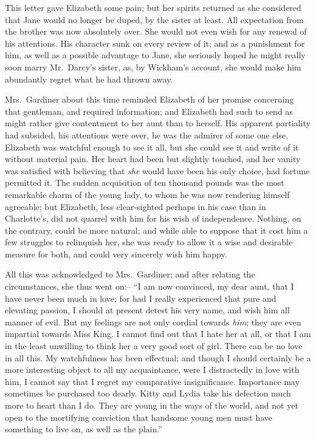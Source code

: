 This letter gave Elizabeth some pain; but her spirits
returned as she considered that Jane would no longer be
duped, by the sister at least. All expectation from the
brother was now absolutely over. She would not even
wish for any renewal of his attentions. His character
sunk on every review of it; and as a punishment for
him, as well as a possible advantage to Jane, she seriously
hoped he might really soon marry Mr.\ Darcy’s sister, as,
by Wickham’s account, she would make him abundantly
regret what he had thrown away.

Mrs.\ Gardiner about this time reminded Elizabeth of
her promise concerning that gentleman, and required
information; and Elizabeth had such to send as might
rather give contentment to her aunt than to herself.
His apparent partiality had subsided, his attentions were
over, he was the admirer of some one else. Elizabeth
was watchful enough to see it all, but she could see it
and write of it without material pain. Her heart had
been but slightly touched, and her vanity was satisfied
with believing that \textit{she} would have been his only choice,
had fortune permitted it. The sudden acquisition of ten
thousand pounds was the most remarkable charm of the
young lady, to whom he was now rendering himself agreeable;
but Elizabeth, less clear-sighted perhaps in his
case than in Charlotte’s, did not quarrel with him for his
wish of independence. Nothing, on the contrary, could
be more natural; and while able to suppose that it cost
him a few struggles to relinquish her, she was ready to
allow it a wise and desirable measure for both, and could
very sincerely wish him happy.

All this was acknowledged to Mrs.\ Gardiner; and after
relating the circumstances, she thus went on:-- “I am
now convinced, my dear aunt, that I have never been much
in love; for had I really experienced that pure and
elevating passion, I should at present detest his very
name, and wish him all manner of evil. But my feelings
are not only cordial towards \textit{him}; they are even impartial
towards Miss King. I cannot find out that I hate her
at all, or that I am in the least unwilling to think her
a very good sort of girl. There can be no love in all this.
My watchfulness has been effectual; and though I should
certainly be a more interesting object to all my acquaintance,
were I distractedly in love with him, I cannot say
that I regret my comparative insignificance. Importance
may sometimes be purchased too dearly. Kitty and Lydia
take his defection much more to heart than I do. They are
young in the ways of the world, and not yet open to the
mortifying conviction that handsome young men must
have something to live on, as well as the plain.”


